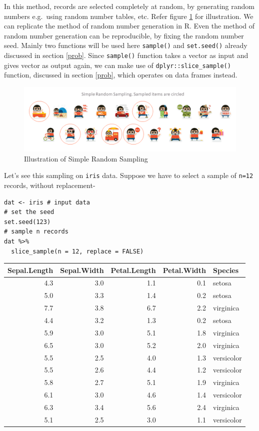 \documentclass[
]{book}
\begin{document}
In this method, records are selected completely at random, by generating random numbers e.g.~using random number tables, etc. Refer figure \ref{fig:simple} for illustration. We can replicate the method of random number generation in R. Even the method of random number generation can be reproducible, by fixing the random number seed. Mainly two functions will be used here \texttt{sample()} and \texttt{set.seed()} already discussed in section \ref{prob}. Since \texttt{sample()} function takes a vector as input and gives vector as output again, we can make use of \texttt{dplyr::slice\_sample()} function, discussed in section \ref{prob}, which operates on data frames instead.

\begin{figure}

{\centering \includegraphics[width=0.99\linewidth]{images/simple} 

}

\caption{Illustration of Simple Random Sampling}\label{fig:simple}
\end{figure}

Let's see this sampling on \texttt{iris} data. Suppose we have to select a sample of \texttt{n=12} records, without replacement-

\begin{verbatim}
dat <- iris # input data
# set the seed
set.seed(123)
# sample n records
dat %>% 
  slice_sample(n = 12, replace = FALSE)
\end{verbatim}

\begin{tabular}{r|r|r|r|l}
\hline
Sepal.Length & Sepal.Width & Petal.Length & Petal.Width & Species\\
\hline
4.3 & 3.0 & 1.1 & 0.1 & setosa\\
\hline
5.0 & 3.3 & 1.4 & 0.2 & setosa\\
\hline
7.7 & 3.8 & 6.7 & 2.2 & virginica\\
\hline
4.4 & 3.2 & 1.3 & 0.2 & setosa\\
\hline
5.9 & 3.0 & 5.1 & 1.8 & virginica\\
\hline
6.5 & 3.0 & 5.2 & 2.0 & virginica\\
\hline
5.5 & 2.5 & 4.0 & 1.3 & versicolor\\
\hline
5.5 & 2.6 & 4.4 & 1.2 & versicolor\\
\hline
5.8 & 2.7 & 5.1 & 1.9 & virginica\\
\hline
6.1 & 3.0 & 4.6 & 1.4 & versicolor\\
\hline
6.3 & 3.4 & 5.6 & 2.4 & virginica\\
\hline
5.1 & 2.5 & 3.0 & 1.1 & versicolor\\
\hline
\end{tabular}
\end{document}
